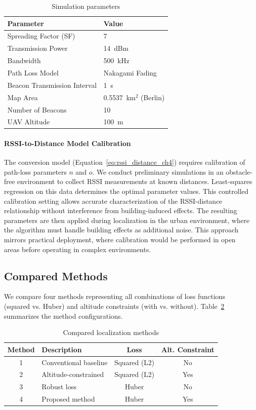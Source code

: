 \documentclass[master,final,11pt]{iscs-thesis}
\begin{document}
\begin{table}[htbp]
\centering
\caption{Simulation parameters}
\label{tab:sim_params}
\begin{tabular}{@{}ll@{}}
\toprule
\textbf{Parameter} & \textbf{Value} \\
\midrule
Spreading Factor (SF) & 7 \\
Transmission Power & 14~dBm \\
Bandwidth & 500~kHz \\
Path Loss Model & Nakagami Fading \\
Beacon Transmission Interval & 1~s \\
Map Area & 0.5537~km$^2$ (Berlin) \\
Number of Beacons & 10 \\
UAV Altitude & 100~m \\
\bottomrule
\end{tabular}
\end{table}

\paragraph{RSSI-to-Distance Model Calibration}
The conversion model (Equation~\ref{eq:rssi_distance_ch4}) requires calibration of path-loss parameters $n$ and $o$.
We conduct preliminary simulations in an obstacle-free environment to collect RSSI measurements at known distances.
Least-squares regression on this data determines the optimal parameter values.
This controlled calibration setting allows accurate characterization of the RSSI-distance relationship without interference from building-induced effects.
The resulting parameters are then applied during localization in the urban environment, where the algorithm must handle building effects as additional noise.
This approach mirrors practical deployment, where calibration would be performed in open areas before operating in complex environments.

\subsection{Compared Methods}

We compare four methods representing all combinations of loss functions (squared vs. Huber) and altitude constraints (with vs. without).
Table~\ref{tab:methods} summarizes the method configurations.

\begin{table}[htbp]
\centering
\caption{Compared localization methods}
\label{tab:methods}
\begin{tabular}{@{}clcc@{}}
\toprule
\textbf{Method} & \textbf{Description} & \textbf{Loss} & \textbf{Alt. Constraint} \\
\midrule
1 & Conventional baseline & Squared (L2) & No \\
2 & Altitude-constrained & Squared (L2) & Yes \\
3 & Robust loss & Huber & No \\
4 & Proposed method & Huber & Yes \\
\bottomrule
\end{tabular}
\end{table}
\end{document}
